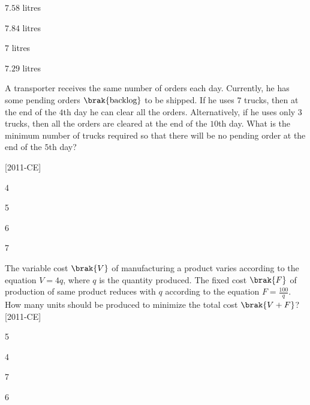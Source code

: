 \begin{enumerate}
\begin{multicols}{4}
\item $7.58$ litres
\item $7.84$ litres
\item $7$ litres
\item $7.29$ litres
\end{multicols}
\end{enumerate}
\item A transporter receives the same number of orders each day. Currently, he has some pending orders $\brak{\text{backlog}}$ to be shipped. If he uses $7$ trucks, then at the end of the $4$th day he can clear all the orders. Alternatively, if he uses only $3$ trucks, then all the orders are cleared at the end of the $10$th day. What is the minimum number of trucks required so that there will be no pending order at the end of the $5$th day? 

    \hfill{[2011-CE]}
\begin{enumerate}
\begin{multicols}{4}
\item 4
\item 5
\item 6
\item 7
\end{multicols}
\end{enumerate}
\item The variable cost $\brak{V}$ of manufacturing a product varies according to the equation $V=4q$, where $q$ is the quantity produced. The fixed cost $\brak{F}$ of production of same product reduces with $q$ according to the equation $F=\frac{100}{q}$. How many units should be produced to minimize the total cost $\brak{V+F}$? \hfill{[2011-CE]}
\begin{enumerate}
\begin{multicols}{4}
\item 5
\item 4
\item 7
\item 6
\end{multicols}
\end{enumerate}
